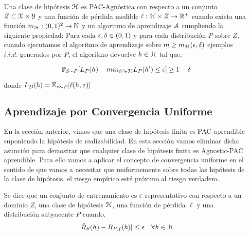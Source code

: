         \begin{definicion}
        Una clase de hipótesis $\mathcal{H}$ es PAC-Agnóstica con respecto a un conjunto $Z \subset \mathcal{X} \times \mathcal{Y}$ y una función de pérdida medible $\ell: \mathcal{H} \times Z \to \mathbb{R}^+$ cuando exista una función $m_{\mathcal{H}}:(0,1)^2 \to \mathbb{N}$ y un algoritmo de aprendizaje $\mathcal{A}$ cumpliendo la siguiente propiedad: Para cada $\epsilon ,\delta \in (0,1)$ y para cada distribución $P$ sobre $Z$, cuando ejecutamos el algoritmo de aprendizaje sobre  $m \geq m_{\mathcal{H}}(\epsilon, \delta)$ ejemplos $i.i.d.$ generados por $P$, el algoritmo devuelve $h \in \mathcal{H}$ tal que,
        
        \begin{equation}
            \mathbb{P}_{S\sim P}[L_P(h) - min_{h' \in \mathcal{H}} L_P(h') \leq \epsilon] \geq 1 - \delta
        \end{equation}
        
        donde $L_D(h) = \mathbb{E}_{z\sim P}[\ell(h,z)]$ 
        
        \end{definicion}
    


\subsection{Aprendizaje por Convergencia Uniforme}

    En la sección anterior, vimos que una clase de hipótesis finita es PAC aprendible suponiendo la hipótesis de realizabilidad. En esta sección vamos eliminar dicha asunción para demostrar que cualquier clase de hipótesis finita es Agnostic-PAC aprendible. Para ello vamos a aplicar el concepto de convergencia uniforme en el sentido de que vamos a necesitar que uniformemente sobre todas las hipótesis de la clase de hipótesis, el riesgo empírico esté próximo al riesgo verdadero. \\
    
    
    \begin{definicion}
    Se dice que un conjunto de entrenamiento es $\epsilon$-representativo con respecto a un dominio $Z$, una clase de hipótesis $\mathcal{H}$, una función de pérdida $\ell$ y una distribución subyacente $P$ cuando,
    \begin{equation}
        |\hat{R}_{S}(h) - R_{P,f}(h)| \leq \epsilon \quad \forall h \in \mathcal{H}
    \end{equation}
    \end{definicion}

